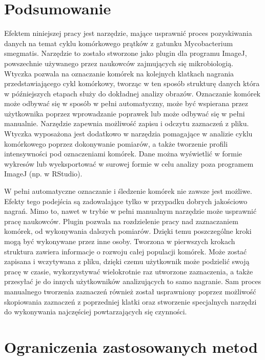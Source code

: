 \documentclass[declaration,shortabstract,mgr]{iithesis}
\begin{document}


\section{Podsumowanie}

Efektem niniejszej pracy jest narzędzie, mające usprawnić proces pozyskiwania danych na temat cyklu komórkowego prątków z gatunku Mycobacterium smegmatis.
Narzędzie to zostało stworzone jako plugin dla programu ImageJ, powszechnie używanego przez naukowców zajmujących się mikrobiologią.
Wtyczka pozwala na oznaczanie komórek na kolejnych klatkach nagrania przedstawiającego cykl komórkowy, tworząc w ten sposób strukturę danych która w późniejszych etapach służy do dokładnej analizy obrazów.
Oznaczanie komórek może odbywać się w sposób w pełni automatyczny, może być wspierana przez użytkownika poprzez wprowadzanie poprawek lub może odbywać się w pełni manualnie.
Narzędzie zapewnia możliwość zapisu i odczytu zaznaczeń z pliku.
Wtyczka wyposażona jest dodatkowo w narzędzia pomagające w analizie cyklu komórkowego poprzez dokonywanie pomiarów, a także tworzenie profili intensywności pod oznaczeniami komórek.
Dane można wyświetlić w formie wykresów lub wyeksportować w surowej formie w celu analizy poza programem ImageJ (np. w RStudio).

W pełni automatyczne oznaczanie i śledzenie komórek nie zawsze jest możliwe.
Efekty tego podejścia są zadowalające tylko w przypadku dobrych jakościowo nagrań.
Mimo to, nawet w trybie w pełni manualnym narzędzie może usprawnić pracę naukowców.
Plugin pozwala na rozdzielenie pracy nad zaznaczaniem komórek, od wykonywania dalszych pomiarów.
Dzięki temu poszczególne kroki mogą być wykonywane przez inne osoby.
Tworzona w pierwszych krokach struktura zawiera informacje o rozwoju całej populacji komórek.
Może zostać zapisana i wczytywana z pliku, dzięki czemu użytkownik może podzielić swoją pracę w czasie, wykorzystywać wielokrotnie raz utworzone zaznaczenia, a także przesyłać je  do innych użytkowników analizujących to samo nagranie.
Sam proces manualnego tworzenia zaznaczeń również został usprawniony poprzez możliwość skopiowania zaznaczeń z poprzedniej klatki oraz stworzenie specjalnych narzędzi do wykonywania najczęściej powtarzających się czynności.

\section{Ograniczenia zastosowanych metod}
\end{document}
